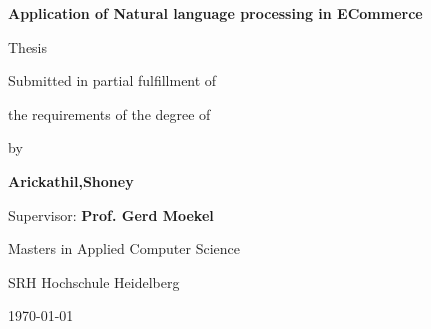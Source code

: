 \begin{titlepage}

    \centering
    {\Large \bfseries Application of Natural language processing in ECommerce}
    \vspace*{3\baselineskip}

    {\Large Thesis}
    \vspace*{3\baselineskip}

    {\Large Submitted in partial fulfillment of }
    \vspace*{0.5\baselineskip}

    {\Large the requirements of the degree of }
    \vspace*{3.5\baselineskip}

    {\Large by }
    \vspace*{0.5\baselineskip}

    {\Large  \bfseries Arickathil,Shoney }
    \vspace*{0.5\baselineskip}

    {\Large  Supervisor: \bfseries Prof. Gerd Moekel }
    \vspace*{3\baselineskip}


    {\Large  Masters in Applied Computer Science }
    \vspace*{0.5\baselineskip}

    {\Large  SRH Hochschule Heidelberg }
    \vspace*{3\baselineskip}

    {\Large \today}
    
\end{titlepage}